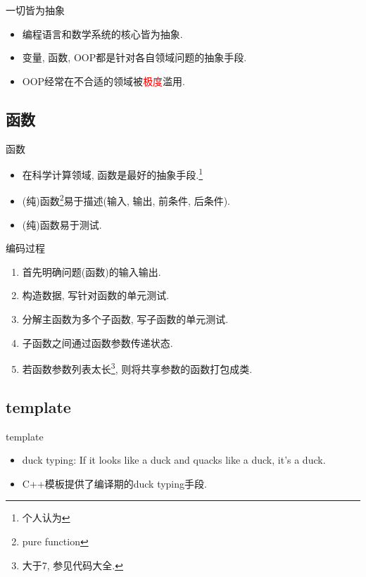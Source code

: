 \documentclass[compress]{beamer}
\begin{document}
\begin{frame}{一切皆为抽象}
    \begin{itemize}[<+->]
        \item 编程语言和数学系统的核心皆为抽象.
        \item 变量, 函数, OOP都是针对各自领域问题的抽象手段.
        \item OOP经常在不合适的领域被\textcolor{red}{极度}滥用.
    \end{itemize}
\end{frame}

\subsection{函数}

\begin{frame}{函数}
    \begin{itemize}[<+->]
        \item 在科学计算领域, 函数是最好的抽象手段.\footnote{个人认为}
        \item (纯)函数\footnote{pure function}易于描述(输入, 输出, 前条件, 后条件).
        \item (纯)函数易于测试.
    \end{itemize}
\end{frame}

\begin{frame}{编码过程}
    \begin{enumerate}[<+->]
        \item 首先明确问题(函数)的输入输出.
        \item 构造数据, 写针对函数的单元测试.
        \item 分解主函数为多个子函数, 写子函数的单元测试.
        \item 子函数之间通过函数参数传递状态.
        \item 若函数参数列表太长\footnote{大于7, 参见代码大全.}, 则将共享参数的函数打包成类.
    \end{enumerate}
\end{frame}

\subsection{template}

\begin{frame}{template}
    \begin{itemize}[<+->]
        \item duck typing: If it looks like a duck and quacks like a duck, it's a duck.
        \item C++模板提供了编译期的duck typing手段.
    \end{itemize}
\end{frame}
\end{document}
